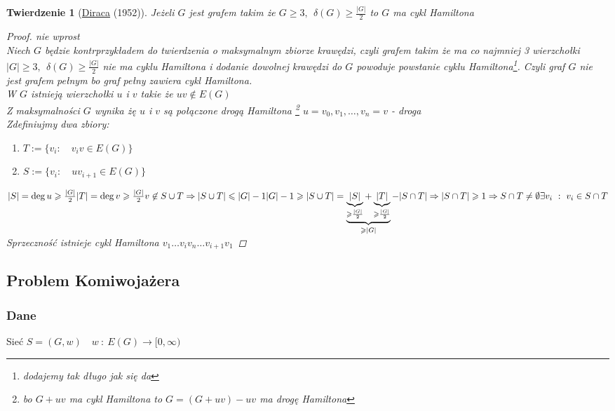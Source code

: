 \documentclass[12pt,a4paper]{article}
\newtheorem{tw}{Twierdzenie}
\theoremstyle{definition}
\newcommand{\egz}{\marginpar{\color{red} EGZAMIN}} %
\begin{document}
\begin{tw}[\href{http://pl.wikipedia.org/wiki/Gabriel_Andrew_Dirac}{Diraca} (1952)]\egz
Jeżeli $G$ jest grafem takim że $G\geqslant 3, ~~ \delta(G)\geqslant \frac{|G|}{2}$ to $G$ ma cykl Hamiltona
\begin{proof}\emph{nie wprost}\\
Niech $G$ będzie kontrprzykładem do twierdzenia o maksymalnym zbiorze krawędzi, czyli grafem takim że ma co najmniej 3 wierzchołki $|G|\geqslant 3, ~~ \delta(G) \geqslant \frac{|G|}{2}$ nie ma cyklu Hamiltona i dodanie dowolnej krawędzi do $G$ powoduje powstanie cyklu Hamiltona\footnote{dodajemy tak długo jak się da}. Czyli graf $G$ nie jest grafem pełnym bo graf pełny zawiera cykl Hamiltona.\\
W $G$ istnieją wierzchołki $u$ i $v$ takie że $uv\not\in E(G)$\\
Z maksymalności $G$ wynika żę $u$ i $v$ są połączone drogą Hamiltona \footnote{bo $G+uv$ ma cykl Hamiltona to $G=(G+uv)-uv$ ma drogę Hamiltona} $u = v_0,v_1,\dots, v_n = v$ - droga\\
Zdefiniujmy dwa zbiory:
	\begin{enumerate}
		\item $T := \{ v_i: \quad v_iv\in E(G)\}$
		\item $S := \{ v_i: \quad uv_{i+1} \in E(G)\}$
	\end{enumerate}
\begin{math}
|S| = \deg u \geqslant \frac{|G|}{2}\\
|T| = \deg v \geqslant \frac{|G|}{2}\\
v \not\in S \cup T \Rightarrow |S \cup T| \leqslant |G| -1\\
|G|-1 \geqslant |S \cup T| = \underbrace{\underbrace{|S|}_{\geqslant\frac{|G|}{2}} + \underbrace{|T|}_{\geqslant\frac{|G|}{2}}}_{\geqslant |G|} - |S \cap T| \Rightarrow |S\cap T| \geqslant 1 \Rightarrow S \cap T \neq \emptyset \\
\exists v_i ~:~ v_i \in S \cap T 
\end{math}
Sprzeczność istnieje cykl Hamiltona $v_1\dots v_iv_n\dots v_{i+1}v_1$
\end{proof}
\end{tw}

\subsection{Problem Komiwojażera}
\subsubsection{Dane} Sieć $S = (G, w)\quad w~:~E(G)\to [0, \infty)$\\
\end{document}
